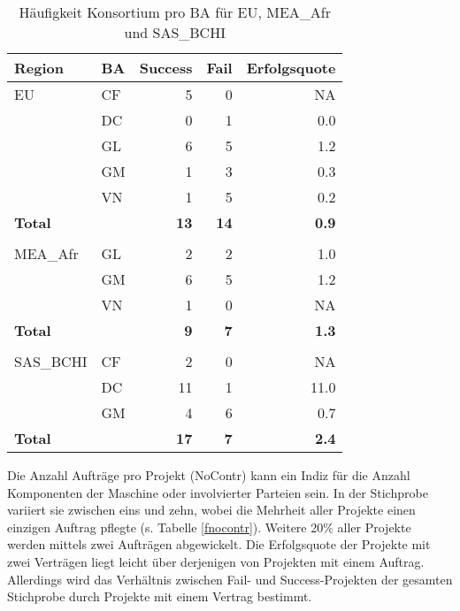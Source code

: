 \begin{table}[htbp]
	\centering
	\caption{Häufigkeit Konsortium pro BA für EU, MEA\_Afr und SAS\_BCHI}
	\begin{tabular}{llrrr}
		\textbf{Region} & \textbf{BA} & \multicolumn{1}{l}{\textbf{Success}} & \multicolumn{1}{l}{\textbf{Fail}} & \multicolumn{1}{l}{\textbf{Erfolgsquote}} \\\hline
		EU  & CF    & 5     & 0     & NA \\
		    & DC    & 0     & 1     & 0.0 \\
		    & GL    & 6     & 5     & 1.2 \\
		    & GM    & 1     & 3     & 0.3 \\
		    &VN    & 1     & 5     & 0.2 \\\hline
		\textbf{Total} &  & \textbf{13} & \textbf{14} & \textbf{0.9} \\
			  &  &  & & \\
	    MEA\_Afr &	GL    & 2     & 2     & 1.0 \\
	             & 	GM    & 6     & 5     & 1.2 \\
		         & VN    & 1     & 0     & NA \\\hline
		\textbf{Total} &  & \textbf{9} & \textbf{7} & \textbf{1.3} \\
		& & & & \\
		    SAS\_BCHI & \multicolumn{1}{l}{CF} & 2     & 0     & NA \\
		 & \multicolumn{1}{l}{DC} & 11    & 1     & 11.0 \\
		  & \multicolumn{1}{l}{GM} & 4     & 6     & 0.7 \\\hline
		\textbf{Total} &       &  \textbf{17}   & \textbf{7}     & \textbf{2.4} \\
	\end{tabular}%
	\label{consregba}%
\end{table}%
%
%
\newpage
Die Anzahl Aufträge pro Projekt (NoContr) kann ein Indiz für die Anzahl Komponenten der Maschine oder involvierter Parteien sein. In der Stichprobe variiert sie zwischen eins und zehn, wobei die Mehrheit aller Projekte einen einzigen Auftrag pflegte (s. Tabelle \ref{fnocontr}). Weitere 20\% aller Projekte werden mittels zwei Aufträgen abgewickelt. Die Erfolgsquote der Projekte mit zwei Verträgen liegt leicht über derjenigen von Projekten mit einem Auftrag. Allerdings wird das Verhältnis zwischen Fail- und Success-Projekten der gesamten Stichprobe durch Projekte mit einem Vertrag bestimmt.
